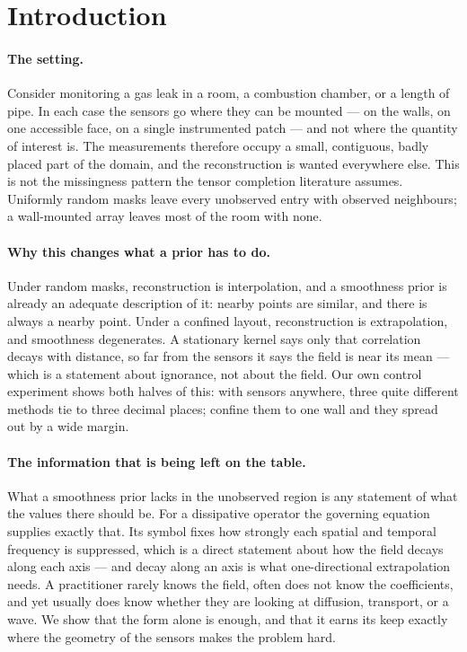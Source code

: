 \section{Introduction}
\label{sec:intro}

\paragraph{The setting.}
Consider monitoring a gas leak in a room, a combustion chamber, or a length of
pipe.  In each case the sensors go where they can be mounted --- on the walls, on
one accessible face, on a single instrumented patch --- and not where the
quantity of interest is.  The measurements therefore occupy a small, contiguous,
badly placed part of the domain, and the reconstruction is wanted everywhere
else.  This is not the missingness pattern the tensor completion literature
assumes.  Uniformly random masks leave every unobserved entry with observed
neighbours; a wall-mounted array leaves most of the room with none.

\paragraph{Why this changes what a prior has to do.}
Under random masks, reconstruction is interpolation, and a smoothness prior is
already an adequate description of it: nearby points are similar, and there is
always a nearby point.  Under a confined layout, reconstruction is extrapolation,
and smoothness degenerates.  A stationary kernel says only that correlation
decays with distance, so far from the sensors it says the field is near its mean
--- which is a statement about ignorance, not about the field.  Our own control
experiment shows both halves of this: with sensors anywhere, three quite
different methods tie to three decimal places; confine them to one wall and they
spread out by a wide margin.

\paragraph{The information that is being left on the table.}
What a smoothness prior lacks in the unobserved region is any statement of what
the values there should be.  For a dissipative operator the governing equation
supplies exactly that.  Its symbol fixes how strongly each spatial and temporal
frequency is suppressed, which is a direct statement about how the field decays
along each axis --- and decay along an axis is what one-directional extrapolation
needs.  A practitioner rarely knows the field, often does not know the
coefficients, and yet usually does know whether they are looking at diffusion,
transport, or a wave.  We show that the form alone is enough, and that it earns
its keep exactly where the geometry of the sensors makes the problem hard.

